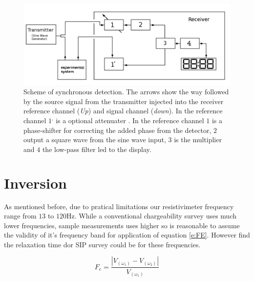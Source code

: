 \documentclass{vie16}
\begin{document}
\begin{figure}[h!]
	\centering
	\includegraphics[keepaspectratio=true,scale=0.3]{Sistema-Inside_Lock_In}
	\caption{Scheme of synchronous detection. The arrows show the way followed by the source signal from the transmitter injected into the receiver reference channel (\textit{Up}) and signal channel (\textit{down}). In the reference channel $1^{,}$ is a optional attenuater%
	 . In the reference channel $1$ is a phase-shifter for correcting the added phase from the detector, $2$ output a square wave from the sine wave input, $3$ is the multiplier and  $4$ the low-pass filter led to the display. }
	\label{f:Lock-in}
\end{figure}





\section{Inversion}
As mentioned before, due to pratical limitations our resistivimeter frequency range from $13$ to $120$Hz.
While a conventional chargeability survey uses much lower frequencies, sample measurements uses higher %
so is reasonable to assume the validity of it's frequency band for application of equation \ref{e:FE}. However
find the relaxation time dor SIP survey could be %
for these frequencies.


\begin{equation}
	F_{e} = \frac{ |V_{(\omega_{1})} - V_{(\omega_{2})}| }{V_{(\omega_{1})}}
	\label{e:FE}
\end{equation}
\end{document}
